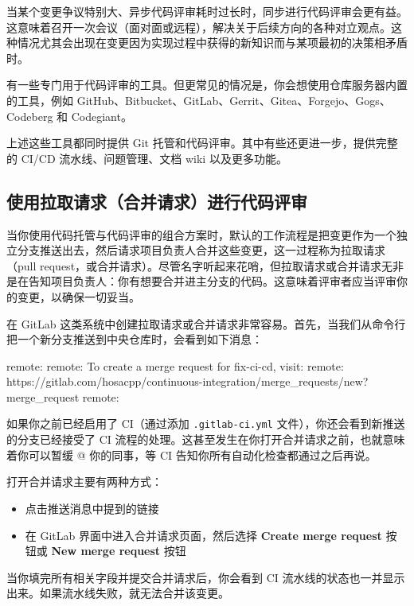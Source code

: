 当某个变更争议特别大、异步代码评审耗时过长时，同步进行代码评审会更有益。这意味着召开一次会议（面对面或远程），解决关于后续方向的各种对立观点。这种情况尤其会出现在变更因为实现过程中获得的新知识而与某项最初的决策相矛盾时。

有一些专门用于代码评审的工具。但更常见的情况是，你会想使用仓库服务器内置的工具，例如 GitHub、Bitbucket、GitLab、Gerrit、Gitea、Forgejo、Gogs、Codeberg 和 Codegiant。

上述这些工具都同时提供 Git 托管和代码评审。其中有些还更进一步，提供完整的 CI/CD 流水线、问题管理、文档 wiki 以及更多功能。

\subsection{使用拉取请求（合并请求）进行代码评审}

\label{idx:922}
\label{idx:923}
当你使用代码托管与代码评审的组合方案时，默认的工作流程是把变更作为一个独立分支推送出去，然后请求项目负责人合并这些变更，这一过程称为拉取请求（pull request，或合并请求）。尽管名字听起来花哨，但拉取请求或合并请求无非是在告知项目负责人：你有想要合并进主分支的代码。这意味着评审者应当评审你的变更，以确保一切妥当。

在 GitLab 这类系统中创建拉取请求或合并请求非常容易。首先，当我们从命令行把一个新分支推送到中央仓库时，会看到如下消息：

\begin{codebox}[text]
remote:
remote: To create a merge request for fix-ci-cd, visit:
remote:   https://gitlab.com/hosacpp/continuous-integration/merge_requests/new?merge_request%
remote:
\end{codebox}

如果你之前已经启用了 CI（通过添加 \texttt{.\allowbreak{}gitlab-ci.\allowbreak{}yml} 文件），你还会看到新推送的分支已经接受了 CI 流程的处理。这甚至发生在你打开合并请求之前，也就意味着你可以暂缓 @ 你的同事，等 CI 告知你所有自动化检查都通过之后再说。

打开合并请求主要有两种方式：

\begin{itemize}
\item 点击推送消息中提到的链接
\item 在 GitLab 界面中进入合并请求页面，然后选择 \textbf{Create merge request} 按钮或 \textbf{New merge request} 按钮
\end{itemize}

当你填完所有相关字段并提交合并请求后，你会看到 CI 流水线的状态也一并显示出来。如果流水线失败，就无法合并该变更。


